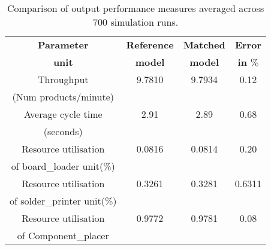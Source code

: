 \begin{table}[]
\begin{center}
\caption{Comparison of output performance measures averaged across 700 simulation runs. \label{table:outparam}}    

\begin{tabular}{|c|c|c|c|}
\hline
\textbf{Parameter}                                                                    & \textbf{Reference} & \textbf{Matched} & \textbf{Error}        \\
\textbf{unit}                                                                         & \textbf{model}     & \textbf{model}   & \textbf{in $\%$}      \\ \hline
Throughput                                                                            & 9.7810              & 9.7934             & 0.12                 \\
(Num products/minute)                                                                 &                    &                  &                       \\ \hline
Average  cycle time                                                                    & 2.91               & 2.89             & 0.68                 \\
(seconds)                                                                             &                    &                  &                       \\ \hline
Resource utilisation                                                                  & 0.0816            & 0.0814         & 0.20                \\
of board\_loader unit(\%)                                                                  &                    &                  &                       \\ \hline
Resource utilisation                                                                  & 0.3261             & 0.3281           & 0.6311                 \\
of solder\_printer unit(\%)                                                                &                    &                  &                       \\ \hline
Resource utilisation                                                                  & 0.9772             & 0.9781           & 0.08                 \\
of Component\_placer                                                                  &                    &                  &                       \\

\end{tabular}
\end{center}
\end{table}
